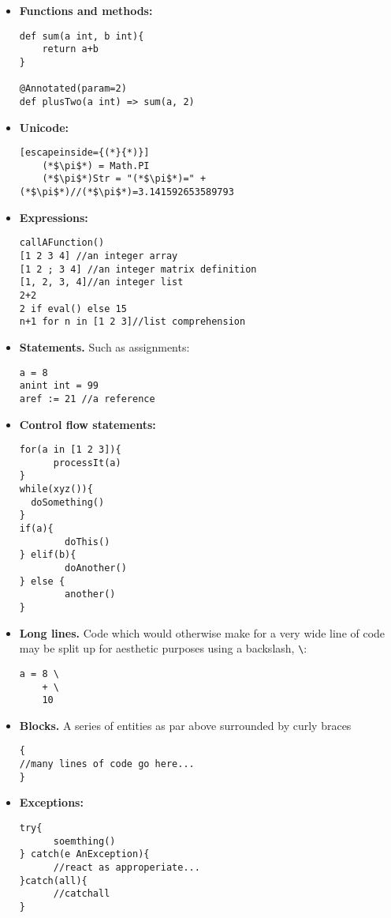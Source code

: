 \documentclass[conc-doc]{subfiles}
\begin{document}
\begin{itemize}
	\item \textbf{Functions and methods:}
	\begin{lstlisting}
def sum(a int, b int){
	return a+b
}

@Annotated(param=2)
def plusTwo(a int) => sum(a, 2)
	\end{lstlisting}
	
	\item \textbf{Unicode:}
	\begin{lstlisting}[escapeinside={(*}{*)}]
	(*$\pi$*) = Math.PI
	(*$\pi$*)Str = "(*$\pi$*)=" + (*$\pi$*)//(*$\pi$*)=3.141592653589793 
	\end{lstlisting}
		
	
	\item \textbf{Expressions:}
	\begin{lstlisting}
callAFunction()
[1 2 3 4] //an integer array
[1 2 ; 3 4] //an integer matrix definition
[1, 2, 3, 4]//an integer list
2+2
2 if eval() else 15
n+1 for n in [1 2 3]//list comprehension
	\end{lstlisting}
	
	\item \textbf{Statements.} Such as assignments:
	\begin{lstlisting}
a = 8
anint int = 99
aref := 21 //a reference
	\end{lstlisting}
	
	\item \textbf{Control flow statements:}
	\begin{lstlisting}
for(a in [1 2 3]){
	  processIt(a)
}
while(xyz()){ 
  doSomething() 
} 
if(a){
		doThis()
} elif(b){
		doAnother()
} else {
		another() 
}
	\end{lstlisting}
	
	\item \textbf{Long lines.} Code which would otherwise make for a very wide line of code may be split up for aesthetic purposes using a backslash, \lstinline{\}:
		\begin{lstlisting}
a = 8 \
	+ \
	10
	\end{lstlisting}
	
	\item \textbf{Blocks.} A series of entities as par above surrounded by curly braces {}
\begin{lstlisting}
{
//many lines of code go here...
}	
\end{lstlisting}

	
	\item \textbf{Exceptions:}
\begin{lstlisting}
try{
	  soemthing()
} catch(e AnException){
	  //react as approperiate...
}catch(all){
	  //catchall
}
\end{lstlisting}


\end{itemize}
\end{document}

